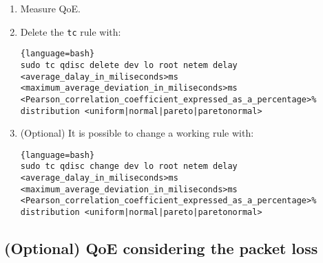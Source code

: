 \begin{enumerate}
  Example:

  \begin{enumerate}
  \item Add the following rule:
    
    \begin{lstlisting}{language=bash}
sudo tc qdisc add dev lo root netem delay 100ms 10ms 25% distribution normal
    \end{lstlisting}
    
  \item Check that the rule has been installed with the command:
    
    \begin{lstlisting}{language=bash}
tc qdisc show dev lo
    \end{lstlisting}
    
    that should output (or something very similar): ``\texttt{ qdisc
      netem 8009: root refcnt 2 limit 1000 delay 100ms 10ms 25\%}''
  \end{enumerate}

\item Measure QoE.

\item Delete the \verb|tc| rule with:
  
  \begin{lstlisting}{language=bash}
sudo tc qdisc delete dev lo root netem delay <average_dalay_in_miliseconds>ms <maximum_average_deviation_in_miliseconds>ms <Pearson_correlation_coefficient_expressed_as_a_percentage>% distribution <uniform|normal|pareto|paretonormal>
  \end{lstlisting}

\item (Optional) It is possible to change a working rule with:

  \begin{lstlisting}{language=bash}
sudo tc qdisc change dev lo root netem delay <average_dalay_in_miliseconds>ms <maximum_average_deviation_in_miliseconds>ms <Pearson_correlation_coefficient_expressed_as_a_percentage>% distribution <uniform|normal|pareto|paretonormal>
  \end{lstlisting}
  
\end{enumerate}

\subsection{(Optional) QoE considering the packet loss}

